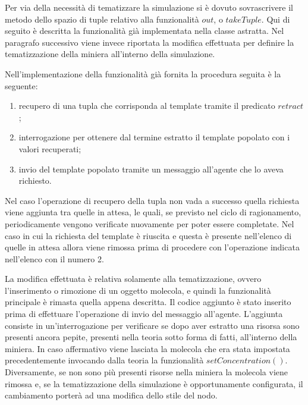 Per via della necessità di tematizzare la simulazione si è dovuto sovrascrivere il metodo dello spazio di tuple relativo alla funzionalità $out$, o $takeTuple$.
Qui di seguito è descritta la funzionalità già implementata nella classe astratta. Nel paragrafo successivo viene invece riportata la modifica effettuata per definire la tematizzazione della miniera all'interno della simulazione.

Nell'implementazione della funzionalità già fornita la procedura seguita è la seguente:
\begin{enumerate}
\item recupero di una tupla che corrisponda al template tramite il predicato $retract$;
\item interrogazione per ottenere dal termine estratto il template popolato con i valori recuperati;
\item invio del template popolato tramite un messaggio all'agente che lo aveva richiesto.
\end{enumerate}
Nel caso l'operazione di recupero della tupla non vada a successo quella richiesta viene aggiunta tra quelle in attesa, le quali, se previsto nel ciclo di ragionamento, periodicamente vengono verificate nuovamente per poter essere completate.
Nel caso in cui la richiesta del template è riuscita e questa è presente nell'elenco di quelle in attesa allora viene rimossa prima di procedere con l'operazione indicata nell'elenco con il numero 2.

La modifica effettuata è relativa solamente alla tematizzazione, ovvero l'inserimento o rimozione di un oggetto molecola, e quindi la funzionalità principale è rimasta quella appena descritta.
Il codice aggiunto è stato inserito prima di effettuare l'operazione di invio del messaggio all'agente. L'aggiunta consiste in un'interrogazione per verificare se dopo aver estratto una risorsa sono presenti ancora pepite, presenti nella teoria sotto forma di fatti, all'interno della miniera. In caso affermativo viene lasciata la molecola che era stata impostata precedentemente invocando dalla teoria la funzionalità $setConcentration()$. Diversamente, se non sono più presenti risorse nella miniera la molecola viene rimossa e, se la tematizzazione della simulazione è opportunamente configurata, il cambiamento porterà ad una modifica dello stile del nodo.

